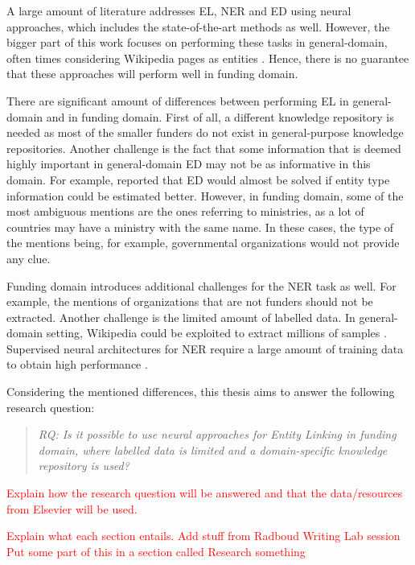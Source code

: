 \documentclass{report}
\theoremstyle{definition}
\theoremstyle{remark}
\begin{document}
A large amount of literature addresses EL, NER and ED using neural approaches, which includes the state-of-the-art methods \cite{REL,LUKE,mulang} as well. However, the bigger part of this work focuses on performing these tasks in general-domain, often times considering Wikipedia pages as entities \cite{nlpnotes}. Hence, there is no guarantee that these approaches will perform well in funding domain.

There are significant amount of differences between performing EL in general-domain and in funding domain. First of all, a different knowledge repository is needed as most of the smaller funders do not exist in general-purpose knowledge repositories.  Another challenge is the fact that some information that is deemed highly important in general-domain ED may not be as informative in this domain. For example, \cite{raiman} reported that ED would almost be solved if entity type information could be estimated better. However, in funding domain, some of the most ambiguous mentions are the ones referring to ministries, as a lot of countries may have a ministry with the same name. In these cases, the type of the mentions being, for example, governmental organizations would not provide any clue. 

Funding domain introduces additional challenges for the NER task as well. For example, the mentions of organizations that are not funders should not be extracted. Another challenge is the limited amount of labelled data. In general-domain setting, Wikipedia could be exploited to extract millions of samples \cite{bunescu-pasca-2006-using}. Supervised neural architectures for NER require a large amount of training data to obtain high performance \cite{NERsurvey}.

Considering the mentioned differences, this thesis aims to answer the following research question:

\begin{quote}\emph{RQ: Is it possible to use neural approaches for Entity Linking in funding domain, where labelled data is limited and a domain-specific knowledge repository is used?}\end{quote}

\textcolor{red}{Explain how the research question will be answered and that the data/resources from Elsevier will be used.}

\textcolor{red}{Explain what each section entails.}
\textcolor{red}{Add stuff from Radboud Writing Lab session}
\textcolor{red}{Put some part of this in a section called Research something}
\newpage
\end{document}
